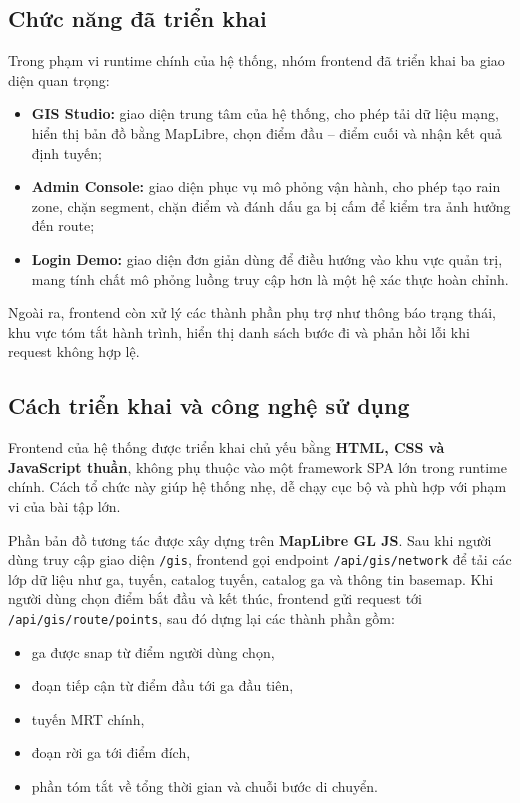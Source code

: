 ﻿\documentclass[../DoAn.tex]{subfiles}
\begin{document}
\subsection{Chức năng đã triển khai}
Trong phạm vi runtime chính của hệ thống, nhóm frontend đã triển khai ba giao diện quan trọng:
\begin{itemize}
    \item \textbf{GIS Studio:} giao diện trung tâm của hệ thống, cho phép tải dữ liệu mạng, hiển thị bản đồ bằng MapLibre, chọn điểm đầu -- điểm cuối và nhận kết quả định tuyến;
    \item \textbf{Admin Console:} giao diện phục vụ mô phỏng vận hành, cho phép tạo rain zone, chặn segment, chặn điểm và đánh dấu ga bị cấm để kiểm tra ảnh hưởng đến route;
    \item \textbf{Login Demo:} giao diện đơn giản dùng để điều hướng vào khu vực quản trị, mang tính chất mô phỏng luồng truy cập hơn là một hệ xác thực hoàn chỉnh.
\end{itemize}

Ngoài ra, frontend còn xử lý các thành phần phụ trợ như thông báo trạng thái, khu vực tóm tắt hành trình, hiển thị danh sách bước đi và phản hồi lỗi khi request không hợp lệ.

\subsection{Cách triển khai và công nghệ sử dụng}
Frontend của hệ thống được triển khai chủ yếu bằng \textbf{HTML, CSS và JavaScript thuần}, không phụ thuộc vào một framework SPA lớn trong runtime chính. Cách tổ chức này giúp hệ thống nhẹ, dễ chạy cục bộ và phù hợp với phạm vi của bài tập lớn.

Phần bản đồ tương tác được xây dựng trên \textbf{MapLibre GL JS}. Sau khi người dùng truy cập giao diện \texttt{/gis}, frontend gọi endpoint \texttt{/api/gis/network} để tải các lớp dữ liệu như ga, tuyến, catalog tuyến, catalog ga và thông tin basemap. Khi người dùng chọn điểm bắt đầu và kết thúc, frontend gửi request tới \texttt{/api/gis/route/points}, sau đó dựng lại các thành phần gồm:
\begin{itemize}[nosep]
    \item ga được snap từ điểm người dùng chọn,
    \item đoạn tiếp cận từ điểm đầu tới ga đầu tiên,
    \item tuyến MRT chính,
    \item đoạn rời ga tới điểm đích,
    \item phần tóm tắt về tổng thời gian và chuỗi bước di chuyển.
\end{itemize}
\end{document}
